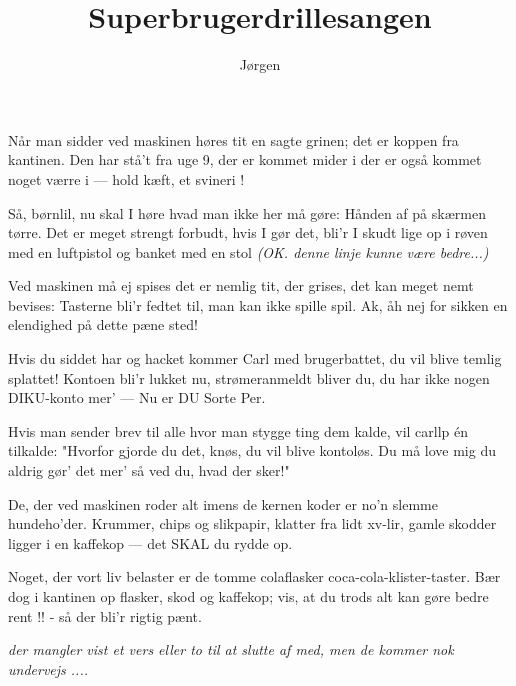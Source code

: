 \documentclass{article}
\title{Superbrugerdrillesangen}
\author{Jørgen}
\begin{document}
\twocolumn[
\maketitle
]
\parskip\baselineskip
\begin{song}%
Når man sidder ved maskinen 
høres tit en sagte grinen;
det er koppen fra kantinen.
Den har stå't fra uge 9,
der er kommet mider i
der er også kommet noget værre i
--- hold kæft, et svineri !

Så, børnlil, nu skal I høre
hvad man ikke her må gøre:
Hånden af på skærmen tørre.
Det er meget strengt forbudt,
hvis I gør det, bli'r I skudt
lige op i røven med en luftpistol
og banket med en stol
{\sl(OK. denne linje kunne være bedre...)}

Ved maskinen må ej spises
det er nemlig tit, der grises,
det kan meget nemt bevises:
Tasterne bli'r fedtet til,
man kan ikke spille spil.
Ak, åh nej for sikken en elendighed
på dette pæne sted!

Hvis du siddet har og hacket
kommer Carl med brugerbattet,
du vil blive temlig splattet!
Kontoen bli'r lukket nu,
strømeranmeldt bliver du,
du har ikke nogen DIKU-konto mer'
--- Nu er DU Sorte Per.

\pagebreak{}

Hvis man sender brev til alle
hvor man stygge ting dem kalde,
vil carllp én tilkalde:
"Hvorfor gjorde du det, knøs,
du vil blive kontoløs.
Du må love mig du aldrig gør' det mer'
så ved du, hvad der sker!"

De, der ved maskinen roder
alt imens de kernen koder
er no'n slemme hundeho'der.
Krummer, chips og slikpapir,
klatter fra lidt xv-lir,
gamle skodder ligger i en kaffekop
--- det SKAL du rydde op.

Noget, der vort liv belaster
er de tomme colaflasker
coca-cola-klister-taster.
Bær dog i kantinen op
flasker, skod og kaffekop;
vis, at du trods alt kan gøre bedre rent !!
- så der bli'r rigtig pænt.
\end{song}
\bigskip

{\sl der mangler vist et vers eller to til at slutte af med, men de kommer nok 
undervejs ....}
\end{document}
